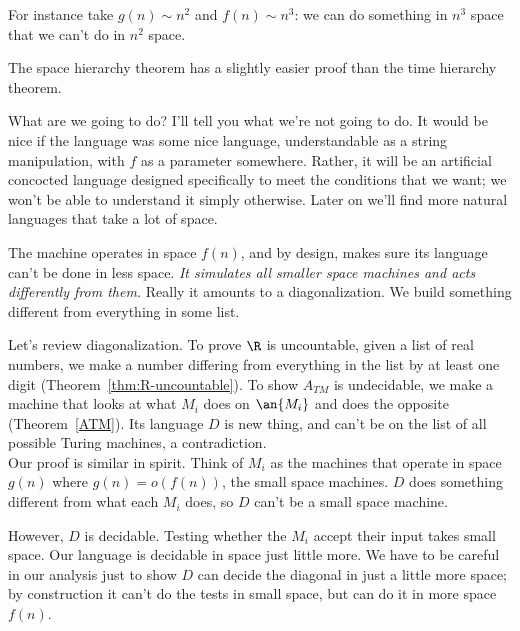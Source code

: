 For instance take $g(n)\sim n^2$ and $f(n)\sim n^3$: we can do something in $n^3$ space that we can't do in $n^2$ space.

The space hierarchy theorem has a slightly easier proof than the time hierarchy theorem.

What are we going to do? I'll tell you what we're not going to do. It would be nice if the language was some nice language, understandable as a string manipulation, with $f$ as a parameter somewhere. Rather, it will be an artificial concocted language designed specifically to meet the conditions that we want; we won't be able to understand it simply otherwise. Later on we'll find more natural languages that take a lot of space.

The machine operates in space $f(n)$, and by design, makes sure its language can't be done in less space. {\it It simulates all smaller space machines and acts differently from them.} Really it amounts to a diagonalization. We build something different from everything in some list. 

Let's review diagonalization. To prove $\R$ is uncountable, given a list of real numbers, we make a number differing from everything in the list by at least one digit (Theorem~\ref{thm:R-uncountable}). To show $A_{TM}$ is undecidable, we make a machine that looks at what $M_i$ does on $\an{M_i}$ and does the opposite (Theorem~\ref{ATM}). Its language $D$ is new thing, and can't be on the list 
of all possible Turing machines, a contradiction.\\ %

Our proof is similar in spirit. Think of $M_i$ as the machines that operate in space $g(n)$ where $g(n)=o(f(n))$, the small space machines. $D$ does something different from what each $M_i$ does, so $D$ can't be a small space machine.

However, $D$ is decidable. Testing whether the $M_i$ accept their input takes small space. Our language is decidable in space just little more. We have to be careful in our analysis just to show $D$ can decide the diagonal in just a little more space; by construction it can't do the tests in small space, but can do it in more space $f(n)$.

